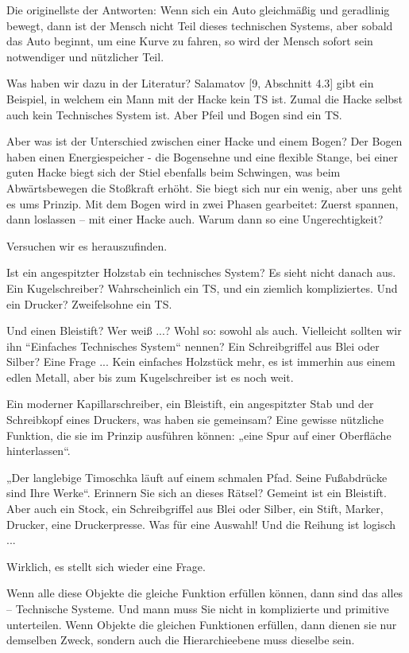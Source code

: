 \documentclass[11pt,a4paper]{article}
\begin{document}
Die originellste der Antworten: Wenn sich ein Auto gleichmäßig und geradlinig
bewegt, dann ist der Mensch nicht Teil dieses technischen Systems, aber sobald
das Auto beginnt, um eine Kurve zu fahren, so wird der Mensch sofort sein
notwendiger und nützlicher Teil.

Was haben wir dazu in der Literatur? Salamatov [9, Abschnitt 4.3] gibt ein
Beispiel, in welchem ein Mann mit der Hacke kein TS ist. Zumal die Hacke
selbst auch kein Technisches System ist. Aber Pfeil und Bogen sind ein TS.

Aber was ist der Unterschied zwischen einer Hacke und einem Bogen? Der Bogen
haben einen Energiespeicher - die Bogensehne und eine flexible Stange, bei
einer guten Hacke biegt sich der Stiel ebenfalls beim Schwingen, was beim
Abwärtsbewegen die Stoßkraft erhöht. Sie biegt sich nur ein wenig, aber uns
geht es ums Prinzip. Mit dem Bogen wird in zwei Phasen gearbeitet: Zuerst
spannen, dann loslassen -- mit einer Hacke auch. Warum dann so eine
Ungerechtigkeit?

Versuchen wir es herauszufinden. 

Ist ein angespitzter Holzstab ein technisches System? Es sieht nicht danach
aus.  Ein Kugelschreiber? Wahrscheinlich ein TS, und ein ziemlich
kompliziertes. Und ein Drucker?  Zweifelsohne ein TS.

Und einen Bleistift? Wer weiß ...? Wohl so: sowohl als auch. Vielleicht
sollten wir ihn “Einfaches Technisches System“ nennen? Ein Schreibgriffel aus
Blei oder Silber? Eine Frage ...  Kein einfaches Holzstück mehr, es ist
immerhin aus einem edlen Metall, aber bis zum Kugelschreiber ist es noch weit.

Ein moderner Kapillarschreiber, ein Bleistift, ein angespitzter Stab und der
Schreibkopf eines Druckers, was haben sie gemeinsam? Eine gewisse nützliche
Funktion, die sie im Prinzip ausführen können: „eine Spur auf einer Oberfläche
hinterlassen“.

„Der langlebige Timoschka läuft auf einem schmalen Pfad. Seine Fußabdrücke
sind Ihre Werke“. Erinnern Sie sich an dieses Rätsel? Gemeint ist ein
Bleistift.  Aber auch ein Stock, ein Schreibgriffel aus Blei oder Silber, ein
Stift, Marker, Drucker, eine Druckerpresse. Was für eine Auswahl! Und die
Reihung ist logisch ...

Wirklich, es stellt sich wieder eine Frage. 

Wenn alle diese Objekte die gleiche Funktion erfüllen können, dann sind das
alles -- Technische Systeme. Und mann muss Sie nicht in komplizierte und
primitive unterteilen. Wenn Objekte die gleichen Funktionen erfüllen, dann
dienen sie nur demselben Zweck, sondern auch die Hierarchieebene muss dieselbe
sein.
\end{document}

